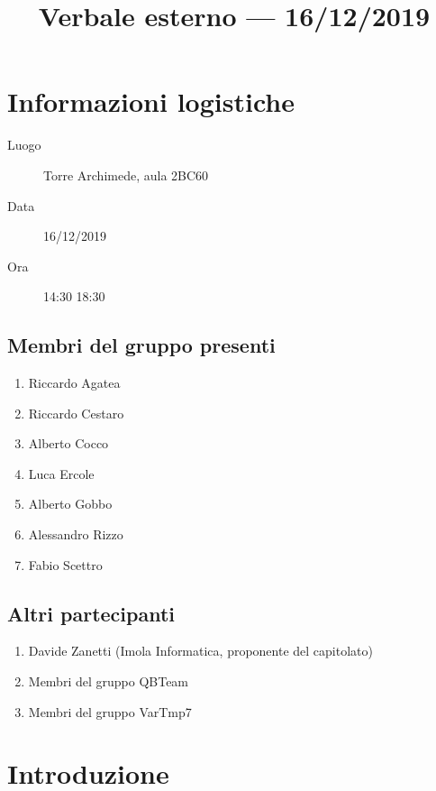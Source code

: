 \documentclass{article}
\title{Verbale esterno --- 16/12/2019}
\begin{document}


\section{Informazioni logistiche}%
\label{sec:informazioni_logistiche}

\begin{description}
  \item [Luogo] Torre Archimede, aula 2BC60
  \item [Data] 16/12/2019
  \item [Ora] 14:30  18:30
\end{description}

\subsection{Membri del gruppo presenti}%
\label{sub:membri_del_gruppo_presenti}

\begin{enumerate}
  \item Riccardo Agatea
  \item Riccardo Cestaro
  \item Alberto Cocco
  \item Luca Ercole
  \item Alberto Gobbo
  \item Alessandro Rizzo
  \item Fabio Scettro
\end{enumerate}

\subsection{Altri partecipanti}%
\label{sub:altri_partecipanti}
\begin{enumerate}
  \item Davide Zanetti (Imola Informatica, proponente del capitolato)
  \item Membri del gruppo QBTeam
  \item Membri del gruppo VarTmp7
\end{enumerate}


\section{Introduzione}%
\label{sec:introduzione}
\end{document}
